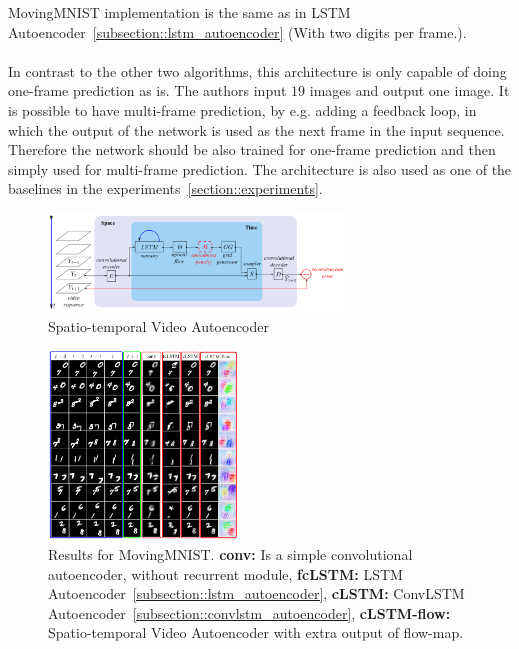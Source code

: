   MovingMNIST implementation is the same as in LSTM Autoencoder~\ref{subsection::lstm_autoencoder} (With two digits per frame.).
  \\\\
  In contrast to the other two algorithms, this architecture is only capable of doing one-frame prediction as is. The authors input $19$ images and output one 
  image. It is possible to have multi-frame prediction, by e.g. adding a feedback loop, in which the output of the network is used as the next frame in the input 
  sequence. Therefore the network should be also trained for one-frame prediction and then simply used for multi-frame prediction. The architecture is also used
  as one of the baselines in the experiments~\ref{section::experiments}.
  \begin{figure}[H]
   \includegraphics[width=0.7\textwidth]{../Images/patraucean.png}
   \centering
   \caption{Spatio-temporal Video Autoencoder \cite{Patraucean2015}}
   \label{fig:spatiotemp_architecture}
  \end{figure}
  \begin{figure}[H]
   \includegraphics[width=0.45\textwidth]{../Images/patraucean_results_mnist.png}
   \centering
   \caption{Results for MovingMNIST. \textbf{conv:} Is a simple convolutional autoencoder, without recurrent module, \textbf{fcLSTM:} LSTM Autoencoder~\ref{subsection::lstm_autoencoder},
   \textbf{cLSTM:} ConvLSTM Autoencoder~\ref{subsection::convlstm_autoencoder}, \textbf{cLSTM-flow:} Spatio-temporal Video Autoencoder with extra output of flow-map. \cite{Patraucean2015}}
   \label{fig:spatiotemp_results}
  \end{figure}
 

